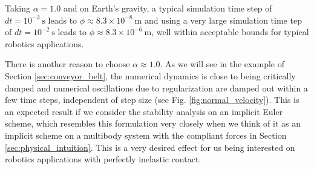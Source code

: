 Taking $\alpha=1.0$ and on Earth's gravity, a typical simulation time step of
$dt=10^{-3}~\text{s}$ leads to $\phi\approx 8.3\times 10^{-8}~\text{m}$ and
using a very large simulation time tep of $dt=10^{-2}~\text{s}$ leads to
$\phi\approx 8.3\times 10^{-6}~\text{m}$, well within acceptable bounds for
typical robotics applications.

There is another reason to choose $\alpha\approx 1.0$. As we will see in the
example of Section \ref{sec:conveyor_belt}, the numerical dynamics is close to
being critically damped and numerical oscillations due to regularization are
damped out within a few time steps, independent of step size (see Fig.
\ref{fig:normal_velocity}). This is an expected result if we consider the
stability analysis on an implicit Euler scheme, which resembles this formulation
very closely when we think of it as an implicit scheme on a multibody system
with the compliant forces  in Section \ref{sec:physical_intuition}. This is a
very desired effect for us being interested on robotics applications with
perfectly inelastic contact.


